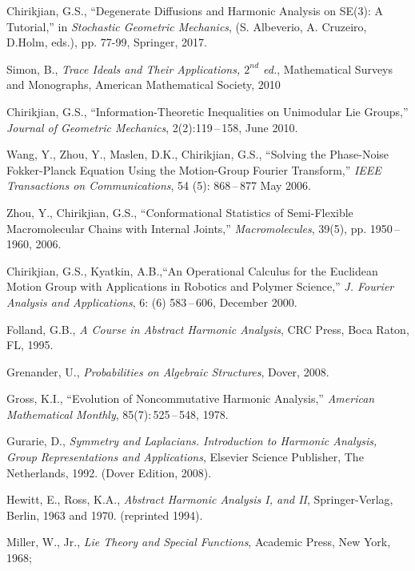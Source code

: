 \documentclass{svmult}
\begin{document}
\begin{thebibliography}{99}

Chirikjian, G.S.,
``Degenerate Diffusions and Harmonic Analysis on SE(3): A Tutorial,'' in {\it Stochastic Geometric Mechanics},
(S. Albeverio, A. Cruzeiro, D.Holm, eds.),
pp. 77-99, Springer, 2017.

Simon, B., {\it Trace Ideals and Their Applications, $2^{nd}$ ed.},
Mathematical Surveys and Monographs, American Mathematical Society, 2010

Chirikjian, G.S., ``Information-Theoretic Inequalities on Unimodular Lie Groups,''
{\it Journal of Geometric Mechanics}, 2(2):119\,--\,158, June 2010.

Wang, Y., Zhou, Y., Maslen, D.K., Chirikjian, G.S., ``Solving the Phase-Noise Fokker-Planck
Equation Using the Motion-Group Fourier Transform,'' {\it IEEE Transactions on Communications},
54 (5): 868\,--\,877 May 2006.

Zhou, Y., Chirikjian, G.S., ``Conformational Statistics of Semi-Flexible Macromolecular Chains
with Internal Joints,'' {\it Macromolecules}, 39(5), pp. 1950\,--\,1960, 2006.

Chirikjian, G.S., Kyatkin, A.B.,``An Operational Calculus for
the Euclidean Motion Group with Applications
in Robotics and Polymer Science,''
{\it J. Fourier Analysis and Applications},
6: (6) 583\,--\,606, December 2000.

Folland, G.B., {\it A Course in Abstract Harmonic
Analysis}, CRC Press, Boca Raton, FL, 1995.

Grenander, U., {\it Probabilities on Algebraic Structures}, Dover, 2008.

Gross, K.I., ``Evolution of Noncommutative
Harmonic Analysis,'' {\it American Mathematical Monthly},
85(7):\,525\,--\,548, 1978.

Gurarie, D., {\it Symmetry and Laplacians. Introduction to
 Harmonic Analysis, Group Representations and Applications},
Elsevier Science Publisher, The Netherlands, 1992. (Dover Edition, 2008).

Hewitt, E., Ross, K.A., {\it Abstract Harmonic Analysis
I, and II}, Springer-Verlag, Berlin, 1963 and 1970. (reprinted 1994).

Miller, W., Jr., {\it Lie Theory and Special Functions},
Academic Press, New York, 1968;


\end{thebibliography}
\end{document}
